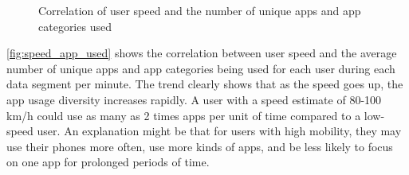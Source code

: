 \begin{figure}
    \centering
    \caption{Correlation of user speed and the number of unique apps and app categories used}
    \label{fig:speed_app_used}
\end{figure}

\autoref{fig:speed_app_used} shows the correlation between user speed and the average number of unique apps and app categories being used for each user during each data segment per minute.
The trend clearly shows that as the speed goes up, the app usage diversity increases rapidly.
A user with a speed estimate of 80-100 km/h could use as many as 2 times apps per unit of time compared to a low-speed user.
An explanation might be that for users with high mobility, they may use their phones more often, use more kinds of apps, and be less likely to focus on one app for prolonged periods of time. 


